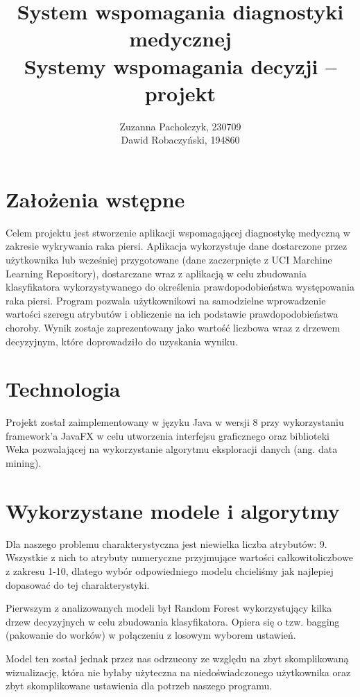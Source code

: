 \documentclass{article}
\title{System wspomagania diagnostyki medycznej
\\ Systemy wspomagania decyzji -- projekt}
\author{Zuzanna Pacholczyk, 230709 \\ 
		Dawid Robaczyński, 194860}
\begin{document}
\maketitle

\section{Założenia wstępne}

Celem projektu jest stworzenie aplikacji wspomagającej diagnostykę medyczną w zakresie wykrywania raka piersi. Aplikacja wykorzystuje dane dostarczone przez użytkownika lub wcześniej przygotowane (dane zaczerpnięte z UCI Marchine Learning Repository), dostarczane wraz z aplikacją w celu zbudowania klasyfikatora wykorzystywanego do określenia prawdopodobieństwa występowania raka piersi. Program pozwala użytkownikowi na samodzielne wprowadzenie wartości szeregu atrybutów i obliczenie na ich podstawie prawdopodobieństwa choroby. Wynik zostaje zaprezentowany jako wartość liczbowa wraz z drzewem decyzyjnym, które doprowadziło do uzyskania wyniku.

\section{Technologia}

Projekt został zaimplementowany w języku Java w wersji 8 przy wykorzystaniu framework'a JavaFX w celu utworzenia interfejsu graficznego oraz biblioteki Weka pozwalającej na wykorzystanie algorytmu eksploracji danych (ang. data mining).

\section{Wykorzystane modele i algorytmy}

Dla naszego problemu charakterystyczna jest niewielka liczba atrybutów: 9. Wszystkie z nich to atrybuty numeryczne przyjmujące wartości całkowitoliczbowe z zakresu 1-10, dlatego wybór odpowiedniego modelu chcieliśmy jak najlepiej dopasować do tej charakterystyki.

Pierwszym z analizowanych modeli był Random Forest wykorzystujący kilka drzew decyzyjnych w celu zbudowania klasyfikatora. Opiera się o tzw. bagging (pakowanie do worków) w połączeniu z losowym wyborem ustawień. 

Model ten został jednak przez nas odrzucony ze względu na zbyt skomplikowaną wizualizację, która nie byłaby użyteczna na niedoświadczonego użytkownika oraz zbyt skomplikowane ustawienia dla potrzeb naszego programu.
\end{document}
